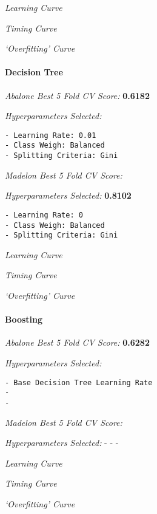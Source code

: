 \documentclass[11pt]{article}
\begin{document}
\emph{Learning Curve}

\emph{Timing Curve}

\emph{`Overfitting' Curve}

    \hypertarget{decision-tree}{%
\paragraph{Decision Tree}\label{decision-tree}}

\emph{Abalone Best 5 Fold CV Score:} \textbf{0.6182}

\emph{Hyperparameters Selected:}

\begin{verbatim}
- Learning Rate: 0.01
- Class Weigh: Balanced
- Splitting Criteria: Gini
\end{verbatim}

\emph{Madelon Best 5 Fold CV Score:}

\emph{Hyperparameters Selected:} \textbf{0.8102}

\begin{verbatim}
- Learning Rate: 0
- Class Weigh: Balanced
- Splitting Criteria: Gini
\end{verbatim}

\emph{Learning Curve}

\emph{Timing Curve}

\emph{`Overfitting' Curve}

    \hypertarget{boosting}{%
\paragraph{Boosting}\label{boosting}}

\emph{Abalone Best 5 Fold CV Score:} \textbf{0.6282}

\emph{Hyperparameters Selected:}

\begin{verbatim}
- Base Decision Tree Learning Rate
-
-
\end{verbatim}

\emph{Madelon Best 5 Fold CV Score:}

\emph{Hyperparameters Selected:} - - -

\emph{Learning Curve}

\emph{Timing Curve}

\emph{`Overfitting' Curve}


    
    
    
    
\end{document}

